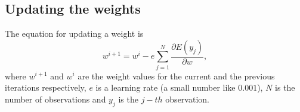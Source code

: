 \subsection{Updating the weights}

The equation for updating a weight is
\[
  w^{i+1} = w^{i} - e \sum_{j=1}^{N} \frac{\partial E(y_j)}{\partial w},
\]
where $w^{i+1}$ and $w^{i}$ are the weight values for the current and the previous iterations respectively, $e$ is a learning rate (a small number like $0.001$), $N$ is the number of observations and $y_j$ is the $j-th$ observation.
